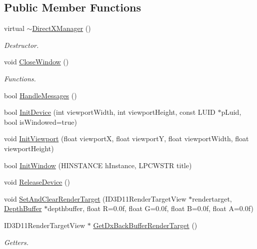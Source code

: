 \subsection*{Public Member Functions}
\begin{DoxyCompactItemize}
\item 
virtual \hyperlink{class_direct_x_manager_a5c9ef465fa2eed372c462fe34fa6a0d1}{$\sim$\+Direct\+X\+Manager} ()
\begin{DoxyCompactList}\small\item\em Destructor. \end{DoxyCompactList}\item 
void \hyperlink{class_direct_x_manager_a50fbe9ef22a71b8d56599735d6b813d9}{Close\+Window} ()
\begin{DoxyCompactList}\small\item\em Functions. \end{DoxyCompactList}\item 
bool \hyperlink{class_direct_x_manager_afc1e06766269d5535ba71c542acdc8e8}{Handle\+Messages} ()
\item 
bool \hyperlink{class_direct_x_manager_a4314d94fefe4c2eec896c45c8cc5a77e}{Init\+Device} (int viewport\+Width, int viewport\+Height, const L\+U\+ID $\ast$p\+Luid, bool is\+Windowed=true)
\item 
void \hyperlink{class_direct_x_manager_a7226059ce9d4970d17cb4924058eb9f2}{Init\+Viewport} (float viewportX, float viewportY, float viewport\+Width, float viewport\+Height)
\item 
bool \hyperlink{class_direct_x_manager_ada12791447237c01bd511c3c6bf822e8}{Init\+Window} (H\+I\+N\+S\+T\+A\+N\+CE h\+Instance, L\+P\+C\+W\+S\+TR title)
\item 
void \hyperlink{class_direct_x_manager_a2d8ffc338f3520548e7fc0ea573b686e}{Release\+Device} ()
\item 
void \hyperlink{class_direct_x_manager_af2bbed3ede3068ae5679632b1c739165}{Set\+And\+Clear\+Render\+Target} (I\+D3\+D11\+Render\+Target\+View $\ast$rendertarget, \hyperlink{class_depth_buffer}{Depth\+Buffer} $\ast$depthbuffer, float R=0.\+0f, float G=0.\+0f, float B=0.\+0f, float A=0.\+0f)
\item 
I\+D3\+D11\+Render\+Target\+View $\ast$ \hyperlink{class_direct_x_manager_a99b3f77cccd824c62979affb01775b68}{Get\+Dx\+Back\+Buffer\+Render\+Target} ()
\begin{DoxyCompactList}\small\item\em Getters. \end{DoxyCompactList}\item 

\end{DoxyCompactItemize}
